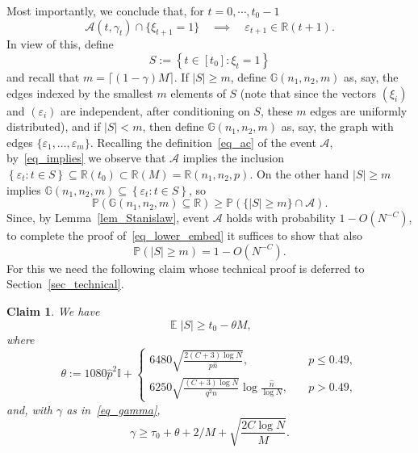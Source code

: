 \documentclass[12pt,reqno]{amsart}
\newcommand{\E}{\operatorname{\mathbb{E}}}
\newcommand{\ac}{{\mathcal{A}}}
\newcommand{\Prob} {\mathbb {P}}
\newcommand{\prob}[1]{\Prob\left(#1\right)}
\newcommand{\eps} {\varepsilon}
\newcommand{\R} {\mathbb R}
\newcommand{\Rnnp}{\R(n_1,n_2,p)}
\newcommand{\G} {\mathbb G}
\newcommand{\Gnnm} {\G(n_1,n_2,m)}
\newcommand{\I} {\mathbb I}
\newtheorem{claim}[theorem]{Claim}
\theoremstyle{definition}
\begin{document}
Most importantly, we conclude that, for $t = 0, \cdots, t_0 - 1$
\begin{equation}
  \label{eq_implies}
\ac(t, \gamma_t) \cap \{\xi_{t+1} = 1\} \quad \implies \quad \eps_{t+1} \in \R(t+1).
\end{equation}
 In view of this, define
\begin{equation*}
  S := \left\{ t \in [t_0] : \xi_t = 1 \right\}
\end{equation*}
and recall that $m=\lceil (1-\gamma)M\rceil$.
If $|S| \ge m$,  define $\Gnnm$ as, say, the edges indexed by the smallest $m$ elements of $S$ (note that since the vectors $(\xi_i)$ and $(\eps_i)$ are independent, after conditioning on $S$, these $m$ edges are uniformly distributed), and if $|S| < m$, then  define $\Gnnm$ as, say, the graph with edges $\{\eps_1, \dots, \eps_m\}$.
Recalling the definition~\eqref{eq_ac} of the event $\ac$, by~\eqref{eq_implies} we observe that $\ac$ implies the inclusion $\left\{ \eps_t : t \in S \right\} \subseteq \R(t_0) \subset \R(M) = \Rnnp$. On the other hand $|S| \ge m$ implies $\Gnnm \subseteq \left\{ \eps_t : t \in S \right\}$, so
\begin{equation*}
\prob{\Gnnm \subseteq \R} \ge \prob{\{|S| \ge m\}\cap \ac }.
\end{equation*}
Since, by Lemma~\ref{lem_Stanislaw}, event $\ac$ holds with probability $1 - O(N^{-C})$, to complete the proof of~\eqref{eq_lower_embed} it suffices to show that also
\begin{equation*}
	\prob{|S| \ge m}  = 1 - O(N^{-C}) .
\end{equation*}
For this we need the following claim whose technical proof is deferred to Section~\ref{sec_technical}.
 \begin{claim}
   \label{clm_sumofgammas}
  We have
\begin{equation}
  \label{eq_theta_p}
  \E |S| \ge t_0 - \theta M,
\end{equation}
where
 \begin{equation*}
	\theta := 1080 \hat p^2 \I +
	\begin{cases}
	  6480\sqrt{\frac{2(C + 3)\log N}{p\hat n}}, &\quad  p \le 0.49, \\
		6250\sqrt{\frac{(C + 3)\log N}{q^2\hat n }  }\log \frac{\hat n}{\log N}, &\quad  p > 0.49,
	\end{cases}
\end{equation*}
and, with $\gamma$ as in~\eqref{eq_gamma},
\begin{equation}
  \label{eq_thetaM}
  \gamma  \ge \tau_0 + \theta  + 2/M + \sqrt{\frac{2C \log N}{M}}.
\end{equation}
 \end{claim}
\end{document}
